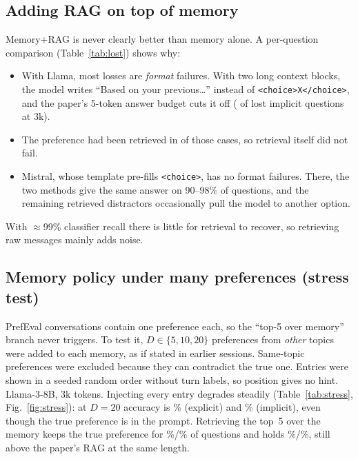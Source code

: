 \documentclass[lettersize,journal]{IEEEtran}
\begin{document}
\subsection{Adding RAG on top of memory}
Memory+RAG is never clearly better than memory alone. A per-question comparison (Table~\ref{tab:lost}) shows why:
\begin{itemize}
  \item With Llama, most losses are \emph{format} failures. With two long context blocks, the model writes ``Based on your previous\ldots''
        instead of \texttt{<choice>X</choice>}, and the paper's 5-token answer budget cuts it off (\qLostImParse{} of \qLostIm{} lost implicit
        questions at 3k).
  \item The preference had been retrieved in \qLostImGold{} of those \qLostIm{} cases, so retrieval itself did not fail.
  \item Mistral, whose template pre-fills \texttt{<choice>}, has no format failures. There, the two methods give the same answer on 90--98\% of
        questions, and the remaining retrieved distractors occasionally pull the model to another option.
\end{itemize}
With $\approx$99\% classifier recall there is little for retrieval to recover, so retrieving raw messages mainly adds noise.

\begin{table}[!t]
\caption{Questions correct with Memory but wrong with Memory+RAG (``Lost''), split into format failures and wrong options; ``Pref.\ retrieved'':
the preference was in the retrieved top~5; ``Gained'' is the reverse.}
\label{tab:lost}
\centering\footnotesize

\end{table}

\subsection{Memory policy under many preferences (stress test)}
PrefEval conversations contain one preference each, so the ``top-5 over memory'' branch never triggers. To test it, $D \in \{5, 10, 20\}$
preferences from \emph{other} topics were added to each memory, as if stated in earlier sessions. Same-topic preferences were excluded because
they can contradict the true one. Entries were shown in a seeded random order without turn labels, so position gives no hint. Llama-3-8B, 3k tokens.
Injecting every entry degrades steadily (Table~\ref{tab:stress}, Fig.~\ref{fig:stress}): at $D{=}20$ accuracy is \qStExAll\% (explicit) and
\qStImAll\% (implicit), even though the true preference is in the prompt. Retrieving the top~5 over the memory keeps the true preference for
\qStKeepEx\%/\qStKeepIm\% of questions and holds \qStExTop\%/\qStImTop\%, still above the paper's RAG at the same length.
\end{document}

